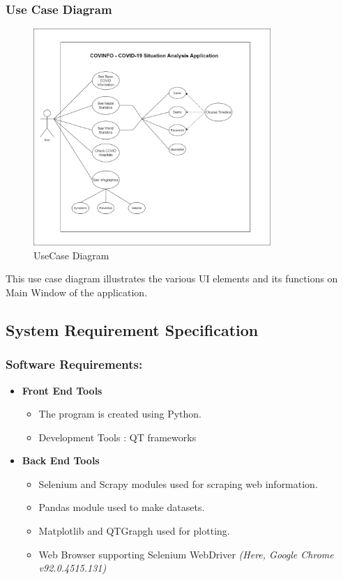 \documentclass[12pt]{article}
\begin{document}
\subsubsection{Use Case Diagram}
\begin{figure}[h]
    \centerline{\includegraphics[width = 90mm]{UseCase Diagram.png}}
    \caption{UseCase Diagram}
    \label{fig}
\end{figure}
This use case diagram illustrates the various UI elements and its functions on Main Window of the application.

\clearpage
\subsection{System Requirement Specification}
\subsubsection{Software Requirements:}
\begin{itemize}
    \item \textbf{Front End Tools}
        \begin{itemize}
            \item The program is created using Python.
            \item Development Tools : QT frameworks
        \end{itemize}
    \item \textbf{Back End Tools}
        \begin{itemize}
            \item Selenium and Scrapy modules used for scraping web information.
            \item Pandas module used to make datasets.
            \item Matplotlib and QTGrapgh used for plotting.
            \item Web Browser supporting Selenium WebDriver \textit{(Here, Google Chrome v92.0.4515.131)}
        \end{itemize}
\end{itemize}
\end{document}
